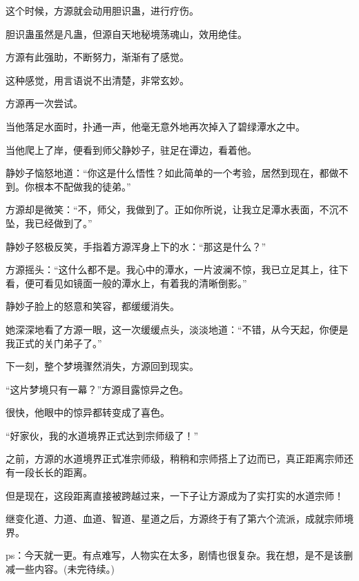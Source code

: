 \begin{this_body}
这个时候，方源就会动用胆识蛊，进行疗伤。

胆识蛊虽然是凡蛊，但源自天地秘境荡魂山，效用绝佳。

方源有此强助，不断努力，渐渐有了感觉。

这种感觉，用言语说不出清楚，非常玄妙。

方源再一次尝试。

当他落足水面时，扑通一声，他毫无意外地再次掉入了碧绿潭水之中。

当他爬上了岸，便看到师父静妙子，驻足在谭边，看着他。

静妙子恼怒地道：“你这是什么悟性？如此简单的一个考验，居然到现在，都做不到。你根本不配做我的徒弟。”

方源却是微笑：“不，师父，我做到了。正如你所说，让我立足潭水表面，不沉不坠，我已经做到了。”

静妙子怒极反笑，手指着方源浑身上下的水：“那这是什么？”

方源摇头：“这什么都不是。我心中的潭水，一片波澜不惊，我已立足其上，往下看，便可看见如镜面一般的潭水上，有着我的清晰倒影。”

静妙子脸上的怒意和笑容，都缓缓消失。

她深深地看了方源一眼，这一次缓缓点头，淡淡地道：“不错，从今天起，你便是我正式的关门弟子了。”

下一刻，整个梦境骤然消失，方源回到现实。

“这片梦境只有一幕？”方源目露惊异之色。

很快，他眼中的惊异都转变成了喜色。

“好家伙，我的水道境界正式达到宗师级了！”

之前，方源的水道境界正式准宗师级，稍稍和宗师搭上了边而已，真正距离宗师还有一段长长的距离。

但是现在，这段距离直接被跨越过来，一下子让方源成为了实打实的水道宗师！

继变化道、力道、血道、智道、星道之后，方源终于有了第六个流派，成就宗师境界。

ps：今天就一更。有点难写，人物实在太多，剧情也很复杂。我在想，是不是该删减一些内容。(未完待续。)

\end{this_body}

